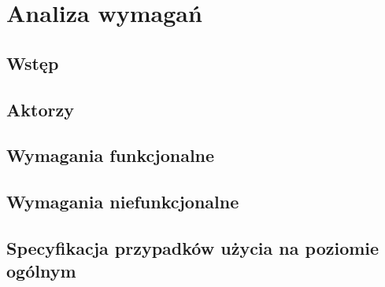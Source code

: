\chapter{Analiza wymagań}

\section{Wstęp} 

\section{Aktorzy}

\section{Wymagania funkcjonalne}

\section{Wymagania niefunkcjonalne}

\section{Specyfikacja przypadków użycia na poziomie ogólnym}